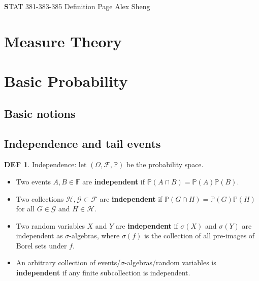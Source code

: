 \documentclass[hidelinks,11pt]{article}
\theoremstyle{definition}
\newtheorem*{defin}{DEF}
\theoremstyle{dotless}
\theoremstyle{remark}
\DeclareMathOperator{\1}{\mathbf{1}}
\begin{document}
\begin{center}
{\Large\textbf STAT 381-383-385 \hspace{0.1cm} Definition Page}\medbreak
\large{Alex Sheng}
\end{center}

\section{Measure Theory}

\section{Basic Probability}

\subsection{Basic notions}

\subsection{Independence and tail events}

\begin{defin}
Independence: let $(\Omega,\mathcal{F},\mathbb{P})$ be the probability space.\begin{itemize}
    \item Two events $A,B\in\mathbb{F}$ are \textbf{independent} if $\mathbb{P}(A\cap B)=\mathbb{P}(A)\mathbb{P}(B)$.
    \item Two collections $\mathcal{H},\mathcal{G}\subset\mathcal{F}$ are \textbf{independent} if $\mathbb{P}(G\cap H)=\mathbb{P}(G)\mathbb{P}(H)$ for all $G\in\mathcal{G}$ and $H\in\mathcal{H}$.
    \item Two random variables $X$ and $Y$ are \textbf{independent} if $\sigma(X)$ and $\sigma(Y)$ are independent as $\sigma$-algebras, where $\sigma(f)$ is the collection of all pre-images of Borel sets under $f$.
    \item An arbitrary collection of events/$\sigma$-algebras/random variables is \textbf{independent} if any finite subcollection is independent.
\end{itemize}
\end{defin}
\end{document}
